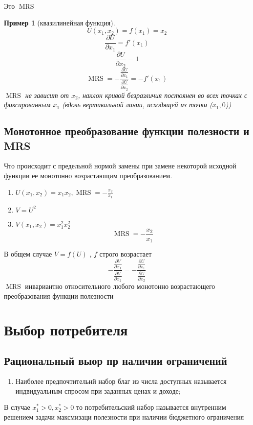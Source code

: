 \documentclass[14pt]{extarticle}
\newtheorem{example}{Пример}
\DeclareMathOperator{\mrs}{MRS}
\begin{document}
Это $\mrs$
\begin{example}[квазилинейная функция]
	\begin{equation}
	U(x_1,x_2) = f(x_1) =x_2
	\end{equation} 
	\begin{equation}
	\frac{\partial U}{\partial x_1} = f'(x_1)
	\end{equation} 
	\begin{equation}
	\frac{\partial U}{\partial x_2} = 1
	\end{equation} 
	\begin{equation}
	\mrs = -\frac{\frac{\partial U}{\partial x_1}}{\frac{\partial U}{\partial x_2}} = - f'(x_1)
	\end{equation} 
	$\mrs$ не зависит от  $x_2$,
	наклон кривой безразличия постоянен во
	всех точках с фиксированным $x_1$
	(вдоль вертикальной линии, исходящей из точки ($x_1,0$))
\end{example}
\subsection{Монотонное преобразование функции
полезности и MRS}
Что происходит с предельной нормой замены при замене некоторой исходной функции ее монотонно возрастающим преобразованием.

\begin{enumerate}
	\item $U(x_1,x_2) = x_1 x_2 , \mrs = -\frac{x_2}{x_1}$
	\item $V = U^2$
	\item $V(x_1,x_2) = x_1^2 x_2^2$
		\begin{equation}
		\mrs = -\frac{x_2}{x_1}
		\end{equation} 
\end{enumerate}
В общем случае $V = f(U)$ , $f$ строго возрастает
 \begin{equation}
-\frac{\frac{\partial V}{\partial x_1}}{\frac{\partial V}{\partial x_2}} =- \frac{\frac{\partial U}{\partial x_1}}{\frac{\partial U}{\partial x_2}}
\end{equation} 
$\mrs$ инвариантно относительного любого
монотонно возрастающего преобразования функции полезности
\section{Выбор потребителя}
\subsection{Рациональный выор пр наличии ограничений}
\begin{enumerate}
	\item Наиболее предпочтительнй набор благ из числа доступных
		называется индвидуальным спросом
		при заданных ценах и доходе;
\end{enumerate}
В случае $x_1^{*} > 0, x_2^{*}>0$ 
то потребительский набор называется внутренним решением задачи
максмизаци полезности при наличии бюджетного ограничения
\end{document}
